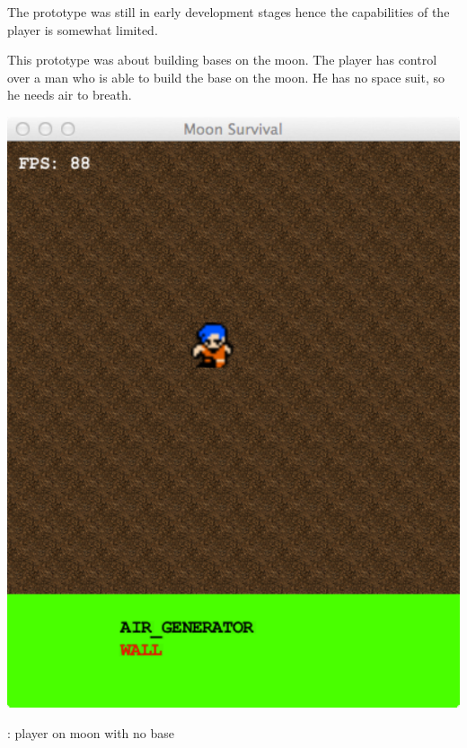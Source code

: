 

The prototype was still in early development stages hence the capabilities of the player is somewhat limited.


This prototype was about building bases on the moon.
The player has control over a man who is able to build the base on the moon.
He has no space suit, so he needs air to breath.

\begin{marginfigure}
	\includegraphics{res/space_base_prototype/no_base.pdf}
	\caption{
	\prototypeSiddall : player on moon with no base
	}
	\label{fig:SpaceBaseNoRoom}
\end{marginfigure}

